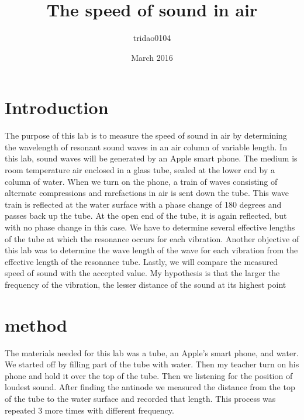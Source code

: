 \documentclass{article}
\title{The speed of sound in air}
\author{tridao0104 }
\date{March 2016}
\begin{document}
\maketitle

\section{Introduction}
The	purpose	of	this	lab	is	to	measure	the	speed	of	sound	in	air	by	determining	
the	wavelength	of	resonant	sound	waves	in	an	air	column	of	variable	length. In	
this	lab,	sound	waves	will	be	generated	by	an Apple smart phone.	The	medium	is	
room	temperature	air	enclosed	in	a	glass	tube,	sealed	at	the	lower	end	by	a	
column	of	water.	When	we turn on the phone,	a	train	of	waves	
consisting	of	alternate	compressions	and	rarefactions	in	air	is	sent	down	the	
tube.	This	wave	train	is	reflected	at	the	water	surface	with	a	phase	change	of	180	
degrees and	passes	back	up	the	tube.	At	the	open	end	of	the	tube,	it	is	again	
reflected,	but	with	no	phase	change in	this	case.	We	have	to	determine	several	
effective	lengths	of	the	tube	at	which	the	resonance	occurs	for	each	vibration.
Another	objective	of	this	lab	was	to	determine	the	wave	length	of	the	wave	for	
each	vibration	from	the	effective	length	of	the	resonance	tube. Lastly,	we	will	
compare	the	measured	speed	of	sound	with	the	accepted	value. My	hypothesis	
is	that	the	larger	the	frequency	of	the	vibration,	the	lesser	distance	of	the	
sound	at	its	highest	point

\section{method}
The	materials	needed	for	this	lab	was	a	tube,	an Apple's smart phone,	and	water.	We	
started	off	by	filling part of	the	tube	with	water.	Then	my teacher turn on his phone and hold it	over	the	top	of	the	tube.	Then we
listening	for	the	position	of	loudest	sound.	After	finding	the	antinode	we	measured	the	
distance	from	the	top	of	the	tube	to	the	water	surface	and	recorded	that	length.	This	
process	was	repeated	3	more	times	with		different	frequency.	
\end{document}
